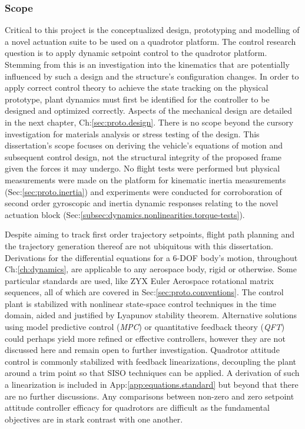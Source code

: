 \subsubsection{Scope}
\label{subsubsec:intro.foreword.scope}
Critical to this project is the conceptualized design, prototyping and modelling of a novel actuation suite to be used on a quadrotor platform. The control research question is to apply dynamic setpoint control to the quadrotor platform. Stemming from this is an investigation into the kinematics that are potentially influenced by such a design and the structure's configuration changes. In order to apply correct control theory to achieve the state tracking on the physical prototype, plant dynamics must first be identified for the controller to be designed and optimized correctly. Aspects of the mechanical design are detailed in the next chapter, Ch:\ref{sec:proto.design}. There is no scope beyond the cursory investigation for materials analysis or stress testing of the design. This dissertation's scope focuses on deriving the vehicle's equations of motion and subsequent control design, not the structural integrity of the proposed frame given the forces it may undergo. No flight tests were performed but physical measurements were made on the platform for kinematic inertia measurements (Sec:\ref{sec:proto.inertia}) and experiments were conducted for corroboration of second order gyroscopic and inertia dynamic responses relating to the novel actuation block (Sec:\ref{subsec:dynamics.nonlinearities.torque-tests}).
\par
Despite aiming to track first order trajectory setpoints, flight path planning and the trajectory generation thereof are not ubiquitous with this dissertation. Derivations for the differential equations for a 6-DOF body's motion, throughout Ch:\ref{ch:dynamics}, are applicable to any aerospace body, rigid or otherwise. Some particular standards are used, like ZYX Euler Aerospace rotational matrix sequences, all of which are covered in Sec:\ref{sec:proto.conventions}. The control plant is stabilized with nonlinear state-space control techniques in the time domain, aided and justified by Lyapunov stability theorem\cite{noteonlyapunov,nonlinearsystems,bojelayupanov}. Alternative solutions using model predictive control (\emph{MPC}) or quantitative feedback theory (\emph{QFT}) could perhaps yield more refined or effective controllers, however they are not discussed here and remain open to further investigation. Quadrotor attitude control is commonly stabilized with feedback linearizations, decoupling the plant around a trim point so that SISO techniques can be applied. A derivation of such a linearization is included in App:\ref{app:equations.standard} but beyond that there are no further discussions. Any comparisons between non-zero and zero setpoint attitude controller efficacy for quadrotors are difficult as the fundamental objectives are in stark contrast with one another.
